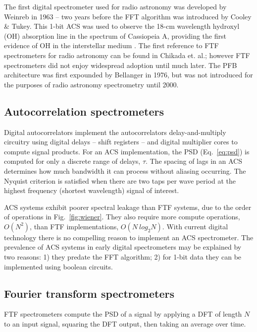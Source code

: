 \documentclass{ws-rv961x669}
\begin{document}
The first digital spectrometer used for radio astronomy was developed by Weinreb\citet{Weinreb:1963p10042} in 1963 -- two years before the FFT algorithm was introduced by Cooley \& Tukey\cite{Cooley1965}. This 1-bit ACS was used to observe the 18-cm wavelength hydroxyl (OH) absorption line in the spectrum of Cassiopeia A, providing the first evidence of OH in the interstellar medium \citep{Weinreb:1963p9992}. The first reference to FTF spectrometers for radio astronomy can be found in Chikada et. al.\citet{Chikada:1987p10044}; however FTF spectrometers did not enjoy widespread adoption until much later. The PFB architecture was first expounded by Bellanger\cite{Bellanger:1976p7898} in 1976, but was not introduced for the purposes of radio astronomy spectrometry until 2000\cite{Bunton2000}.



\subsection{Autocorrelation spectrometers}\label{sub:acs}

Digital autocorrelators implement the autocorrelators delay-and-multiply circuitry using digital delays -- shift registers -- and digital multiplier cores to compute signal products. For an ACS implementation, the PSD (Eq.~\ref{eq:psd}) is computed for only a discrete range of delays, $\tau$. The spacing of lags in an ACS determines how much bandwidth it can process without aliasing occurring. The Nyquist criterion is satisfied when there are two taps per wave period at the highest frequency (shortest wavelength) signal of interest.

ACS systems exhibit poorer spectral leakage than FTF systems, due to the order of operations in Fig.~\ref{fig:wiener}. They also require more compute operations, $O(N^2)$, than FTF implementations, $O(N~log_{2}N)$. With current digital technology there is no compelling reason to implement an ACS spectrometer. The prevalence of ACS systems in early digital spectrometers may be explained by two reasons: 1) they predate the FFT algorithm; 2) for 1-bit data they can be implemented using boolean circuits. 

\subsection{Fourier transform spectrometers}\label{sub:ftf}

FTF spectrometers compute the PSD of a signal by applying a DFT of length $N$ to an input signal, squaring the DFT output, then taking an average over time. 
\end{document}
